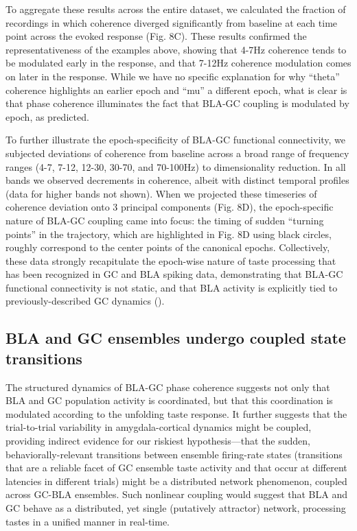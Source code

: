 \begin{refsection}
To aggregate these results across the entire dataset, we calculated the fraction of recordings in which coherence diverged significantly from baseline at each time point across the evoked response (Fig. 8C). These results confirmed the representativeness of the examples above, showing that 4-7Hz coherence tends to be modulated early in the response, and that 7-12Hz coherence modulation comes on later in the response. While we have no specific explanation for why “theta” coherence highlights an earlier epoch and “mu” a different epoch, what is clear is that phase coherence illuminates the fact that BLA-GC coupling is modulated by epoch, as predicted.

To further illustrate the epoch-specificity of BLA-GC functional connectivity, we subjected deviations of coherence from baseline across a broad range of frequency ranges (4-7, 7-12, 12-30, 30-70, and 70-100Hz) to dimensionality reduction. In all bands we observed decrements in coherence, albeit with distinct temporal profiles (data for higher bands not shown). When we projected these timeseries of coherence deviation onto 3 principal components (Fig. 8D), the epoch-specific nature of BLA-GC coupling came into focus: the timing of sudden “turning points” in the trajectory, which are highlighted in Fig. 8D using black circles, roughly correspond to the center points of the canonical epochs. Collectively, these data strongly recapitulate the epoch-wise nature of taste processing that has been recognized in GC and BLA spiking data, demonstrating that BLA-GC functional connectivity is not static, and that BLA activity is explicitly tied to previously-described GC dynamics (\cite{lin2021a}).

\subsection{BLA and GC ensembles undergo coupled state transitions}
The structured dynamics of BLA-GC phase coherence suggests not only that BLA and GC population activity is coordinated, but that this coordination is modulated according to the unfolding taste response. It further suggests that the trial-to-trial variability in amygdala-cortical dynamics might be coupled, providing indirect evidence for our riskiest hypothesis—that the sudden, behaviorally-relevant transitions between ensemble firing-rate states (transitions that are a reliable facet of GC ensemble taste activity and that occur at different latencies in different trials) might be a distributed network phenomenon, coupled across GC-BLA ensembles. Such nonlinear coupling would suggest that BLA and GC behave as a distributed, yet single (putatively attractor) network, processing tastes in a unified manner in real-time.


\end{refsection}

